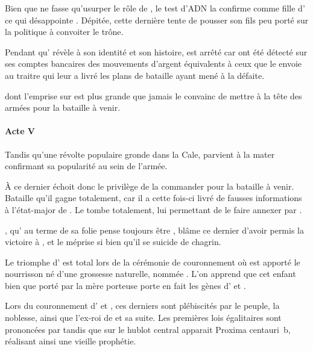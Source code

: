 Bien que \ela{} ne fasse qu’usurper le rôle de \princesse{}, le test d’ADN la confirme comme fille d’\roi{} ce qui désappointe \reine. Dépitée, cette dernière tente de pousser son fils \vladimir{} peu porté sur la politique à convoiter le trône.

Pendant qu’\elena{} révèle à \ela{} son identité et son histoire, \vladimir{} est arrêté car ont été détecté sur ses comptes bancaires des mouvements d’argent équivalents à ceux que le \campoppose{} envoie au traitre qui leur a livré les plans de bataille ayant mené à la défaite.

\ela{} dont l’emprise sur \roi{} est plus grande que jamais le convainc de mettre \elena{} à la tête des armées pour la bataille à venir.

\paragraph{Acte V}
Tandis qu’une révolte populaire gronde dans la Cale, \elena{} parvient à la mater confirmant sa popularité au sein de l’armée.

À ce dernier échoit donc le privilège de la commander pour la bataille à venir. Bataille qu’il gagne totalement, car il a cette fois-ci livré de fausses informations à l’état-major de \campoppose{}. Le \campoppose{} tombe totalement, lui permettant de le faire annexer par \campprincipal{}.

\ela{}, qu’\roi{} au terme de sa folie pense toujours être \princesse{}, blâme ce dernier d’avoir permis la victoire à \elena{}, et le méprise si bien qu’il se suicide de chagrin.

Le triomphe d’\elena{} est total lors de la cérémonie de couronnement où est apporté le nourrisson né d’une grossesse naturelle, nommée \cleopatre{}. L’on apprend que cet enfant bien que porté par la mère porteuse \catin{} porte en fait les gènes d’\elena{} et \ela{}.

Lors du couronnement d’\elena{} et \ela{}, ces derniers sont plébiscités par le peuple, la noblesse, ainsi que l’ex-roi de \campoppose{} et sa suite. Les premières lois égalitaires sont prononcées par \elena{} tandis que sur le hublot central apparait Proxima centauri~b, réalisant ainsi une vieille prophétie.

